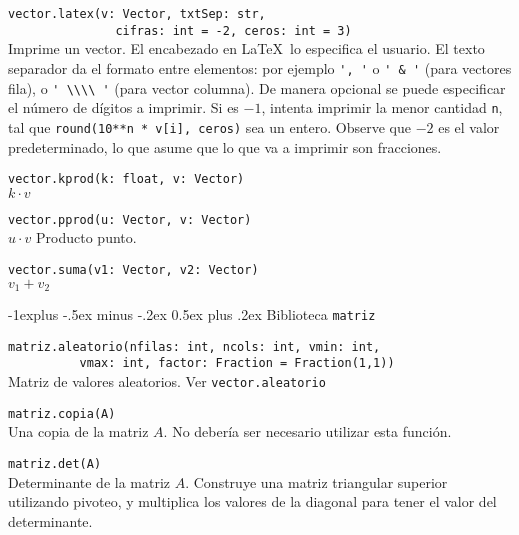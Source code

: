 \documentclass[10pt,landscape]{article}
\makeatletter
\renewcommand{\subsection}{\@startsection{subsection}{2}{0mm}%
                                {-1explus -.5ex minus -.2ex}%
                                {0.5ex plus .2ex}%
                                {\normalfont\normalsize\bfseries}}
\makeatother
\begin{document}
\begin{multicols}{3}
\begin{asparaitem}
\item \verb|vector.latex(v: Vector, txtSep: str,| \\
      \verb|               cifras: int = -2, ceros: int = 3)| \\
  \quad Imprime un vector. El encabezado en \LaTeX\ lo especifica el usuario. El texto separador da el formato entre elementos: por ejemplo \verb|', '| o \verb|' & '| (para vectores fila), o \verb|' \\\\ '| (para vector columna). De manera opcional se puede especificar el n\'umero de d\'igitos a imprimir. Si es $-1$, intenta imprimir la menor cantidad \verb|n|, tal que \verb|round(10**n * v[i], ceros)| sea un entero. Observe que $-2$ es el valor predeterminado, lo que asume que lo que va a imprimir son fracciones.

\item \verb|vector.kprod(k: float, v: Vector)| \\
\quad $k\cdot v$

\item \verb|vector.pprod(u: Vector, v: Vector)| \\
\quad $u\cdot v$ Producto punto.

\item \verb|vector.suma(v1: Vector, v2: Vector)| \\
\quad $v_1 + v_2$
\end{asparaitem}

\subsection{Biblioteca \texttt{matriz}}

\begin{asparaitem}
\item \verb|matriz.aleatorio(nfilas: int, ncols: int, vmin: int,| \\
  \verb|          vmax: int, factor: Fraction = Fraction(1,1))| \\
  \quad Matriz de valores aleatorios. Ver \verb|vector.aleatorio|

\item \verb|matriz.copia(A)| \\
  \quad Una copia de la matriz $A$. No deber\'ia ser necesario utilizar esta funci\'on.

\item \verb|matriz.det(A)| \\
  \quad Determinante de la matriz $A$. Construye una matriz triangular superior utilizando pivoteo, y multiplica los valores de la diagonal para tener el valor del determinante.


\end{asparaitem}
\end{multicols}
\end{document}
